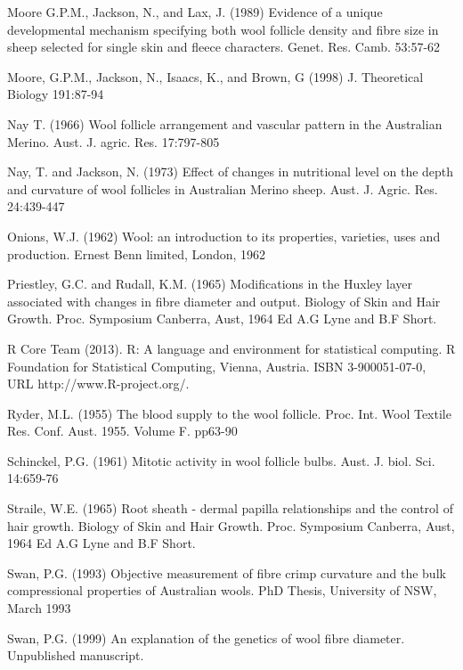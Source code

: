 \documentclass[titlepage]{article}  %
\begin{document}
\begin{thebibliography}{99}
Moore G.P.M., Jackson, N., and Lax, J. (1989) Evidence of a unique developmental mechanism specifying both wool follicle density and fibre size in sheep selected for single skin and fleece characters. Genet. Res. Camb. 53:57-62

Moore, G.P.M., Jackson, N., Isaacs, K., and Brown, G (1998) J. Theoretical Biology 191:87-94

Nay T. (1966) Wool follicle arrangement and vascular pattern in the Australian Merino. Aust. J. agric. Res. 17:797-805

Nay, T. and Jackson, N. (1973) Effect of changes in nutritional level on the depth and curvature of wool follicles in Australian Merino sheep. Aust. J. Agric. Res. 24:439-447

Onions, W.J. (1962) Wool: an introduction to its properties, varieties, uses
     and production. Ernest Benn limited, London, 1962

Priestley, G.C. and Rudall, K.M. (1965) Modifications in the Huxley layer associated with changes in fibre diameter and output. Biology of Skin and Hair Growth. Proc. Symposium Canberra, Aust, 1964 Ed A.G Lyne and B.F Short.

R Core Team (2013). R: A language and environment for statistical
  computing. R Foundation for Statistical Computing, Vienna, Austria.
  ISBN 3-900051-07-0, URL http://www.R-project.org/.

Ryder, M.L. (1955) The blood supply to the wool follicle. Proc. Int. Wool Textile Res. Conf. Aust. 1955. Volume F. pp63-90

Schinckel, P.G. (1961) Mitotic activity in wool follicle bulbs. Aust. J. biol. Sci. 14:659-76

Straile, W.E. (1965) Root sheath - dermal papilla relationships and the control of hair growth. Biology of Skin and Hair Growth.  Proc. Symposium Canberra, Aust, 1964 Ed A.G Lyne and B.F Short.

Swan, P.G. (1993) Objective measurement of fibre crimp curvature and the bulk compressional properties of Australian wools. PhD Thesis, University of NSW, March 1993 

Swan, P.G. (1999) An explanation of the genetics of wool fibre diameter. Unpublished manuscript.

\end{thebibliography}
\end{document}
